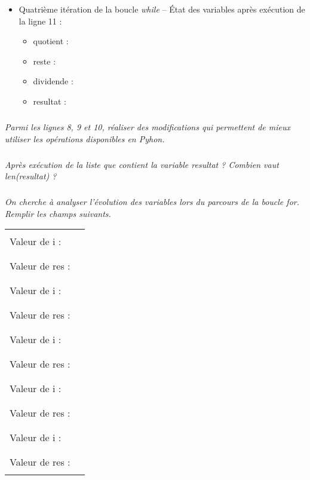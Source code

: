 \documentclass[10pt]{article}
\begin{document}
\vspace{.5cm}
\begin{itemize}
\item Quatrième itération de la boucle \textsl{while} -- État des variables après exécution de la ligne 11 :
\begin{itemize}
\item \textsf{quotient} : \dotfill
\item \textsf{reste} : \dotfill
\item \textsf{dividende} : \dotfill
\item \textsf{resultat} : \dotfill
\end{itemize}
\end{itemize}

\subparagraph{}\textit{Parmi les lignes 8, 9 et 10, réaliser des modifications qui permettent de mieux utiliser les opérations disponibles en Pyhon. }

\subparagraph{}\textit{Après exécution de la liste que contient la variable \textsf{resultat} ?
 Combien vaut \textsf{len(resultat)} ?}
 
 \subparagraph{}\textit{On cherche à analyser l'évolution des variables lors du parcours de la boucle \textsf{for}. Remplir les champs suivants.}

\begin{center}
\begin{tabular}{|p{}|p{}|}
\hline
\\
Valeur de i : &  \\
\\
\hline
\\
Valeur de res : & \\
\\
\hline
\hline
\\
Valeur de i : &  \\
\\
\hline
\\
Valeur de res : & \\
\\
\hline
\hline
\\
Valeur de i : &  \\
\\
\hline
\\
Valeur de res : & \\
\\
\hline
\hline
\\
Valeur de i : &  \\
\\
\hline
\\
Valeur de res : & \\
\\
\hline
\hline
\\
Valeur de i : &  \\
\\
\hline
\\
Valeur de res : & \\
\\
\hline
\end{tabular}
\end{center}
\end{document}
